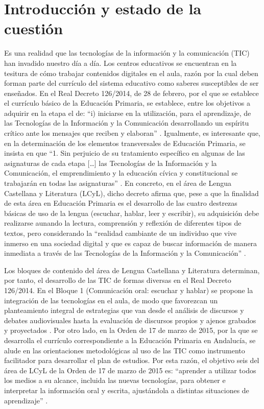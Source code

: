 \documentclass[spanish]{textolivre}
\begin{document}
\section{Introducción y estado de la cuestión}\label{sec-intro}
Es una realidad que las tecnologías de la información y la comunicación (TIC) han invadido nuestro día a día. Los centros educativos se encuentran en la tesitura de cómo trabajar contenidos digitales en el aula, razón por la cual deben forman parte del currículo del sistema educativo como saberes susceptibles de ser enseñados. En el Real Decreto 126/2014, de 28 de febrero, por el que se establece el currículo básico de la Educación Primaria, se establece, entre los objetivos a adquirir en la etapa el de: “i) iniciarse en la utilización, para el aprendizaje, de las Tecnologías de la Información y la Comunicación desarrollando un espíritu crítico ante los mensajes que reciben y elaboran” \cite[p. 19354]{ministerio_de_educacion_y_ciencia_real_2014}. Igualmente, es interesante que, en la determinación de los elementos transversales de Educación Primaria, se insista en que “1. Sin perjuicio de su tratamiento específico en algunas de las asignaturas de cada etapa […] las Tecnologías de la Información y la Comunicación, el emprendimiento y la educación cívica y constitucional se trabajarán en todas las asignaturas” \cite[p. 19356]{ministerio_de_educacion_y_ciencia_real_2014}. En concreto, en el área de Lengua Castellana y Literatura (LCyL), dicho decreto afirma que, pese a que la finalidad de esta área en Educación Primaria es el desarrollo de las cuatro destrezas básicas de uso de la lengua (escuchar, hablar, leer y escribir), su adquisición debe realizarse aunando la lectura, comprensión y reflexión de diferentes tipos de textos, pero considerando la “realidad cambiante de un individuo que vive inmerso en una sociedad digital y que es capaz de buscar información de manera inmediata a través de las Tecnologías de la Información y la Comunicación” \cite[p. 19378]{ministerio_de_educacion_y_ciencia_real_2014}.

Los bloques de contenido del área de Lengua Castellana y Literatura determinan, por tanto, el desarrollo de las TIC de formas diversas en el Real Decreto 126/2014. En el Bloque 1 (Comunicación oral: escuchar y hablar) se propone la integración de las tecnologías en el aula, de modo que favorezcan un planteamiento integral de estrategias que van desde el análisis de discursos y debates audiovisuales hasta la evaluación de discursos propios y ajenos grabados y proyectados \cite[p. 19379]{ministerio_de_educacion_y_ciencia_real_2014}. Por otro lado, en la Orden de 17 de marzo de 2015, por la que se desarrolla el currículo correspondiente a la Educación Primaria en Andalucía, se alude en las orientaciones metodológicas al uso de las TIC como instrumento facilitador para desarrollar el plan de estudios. Por esta razón, el objetivo seis del área de LCyL de la Orden de 17 de marzo de 2015 es: “aprender a utilizar todos los medios a su alcance, incluida las nuevas tecnologías, para obtener e interpretar la información oral y escrita, ajustándola a distintas situaciones de aprendizaje” \cite[p. 157]{junta_de_andalucia_orden_2015}. 
\end{document}
